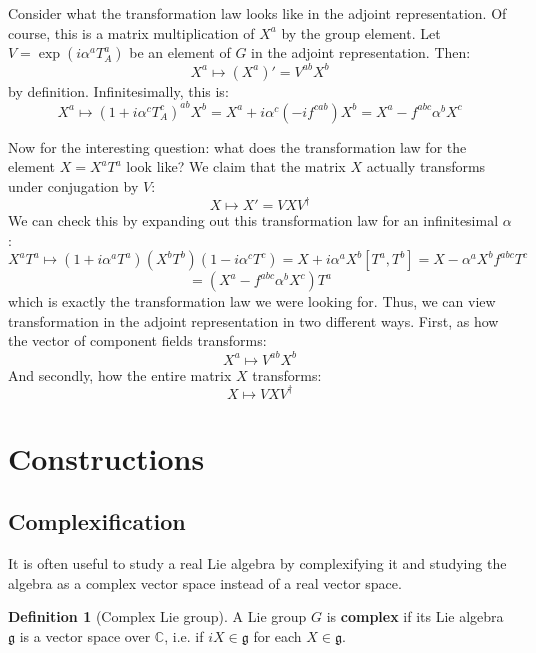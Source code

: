 \documentclass[11pt, oneside]{article}   	%
\theoremstyle{definition}
\newtheorem{definition}{Definition}[section]
\begin{document}
Consider what the transformation law looks like in the adjoint representation. Of course, this is 
a matrix multiplication of $X^a$ by the group element. Let $V = \exp(i\alpha^a T_A^a)$ be an element of 
$G$ in the adjoint representation. Then:
\begin{equation}
	X^a\mapsto (X^a)' = V^{ab}X^b
\end{equation}
by definition. Infinitesimally, this is:
\begin{equation}
	X^a\mapsto (1 + i\alpha^c T_A^c)^{ab} X^b = X^a + i\alpha^c (-if^{cab})X^b = X^a - 
	f^{abc}\alpha^b X^c
\end{equation}

Now for the interesting question: what does the transformation law for the element $X = X^a T^a$ 
look like? We claim that the matrix $X$ actually transforms under conjugation by $V$:
\begin{equation}
	X\mapsto X' = VXV^\dagger
\end{equation}
We can check this by expanding out this transformation law for an infinitesimal $\alpha$:
$$
	X^a T^a\mapsto (1 + i\alpha^a T^a) (X^b T^b) (1 - i\alpha^c T^c) = X + i\alpha^a X^b [T^a, T^b]
	= X - \alpha^a X^bf^{abc}T^c 
$$
$$
	= (X^a - f^{abc}\alpha^b X^c)T^a
$$
which is exactly the transformation law we were looking for. Thus, we can view transformation in the 
adjoint representation in two different ways. First, as how the vector of component fields transforms:
\begin{equation}
	X^a\mapsto V^{ab} X^b
\end{equation}
And secondly, how the entire matrix $X$ transforms:
\begin{equation}
	X\mapsto VXV^\dagger
\end{equation}

\newpage
\section{Constructions}

\subsection{Complexification}

It is often useful to study a real Lie algebra by complexifying it and studying the algebra as a complex 
vector space instead of a real vector space. 
\begin{definition}[Complex Lie group]
	A Lie group $G$ is \textbf{complex} if its Lie algebra $\mathfrak g$ is a vector space over $\mathbb C$, 
	i.e. if $iX\in\mathfrak g$ for each $X\in\mathfrak g$. 
\end{definition}
\end{document}

